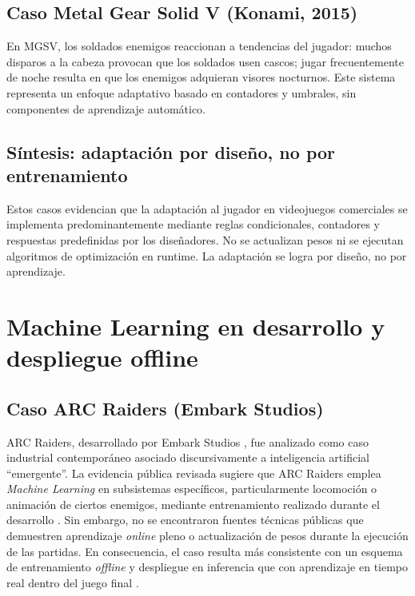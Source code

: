 \subsection{Caso Metal Gear Solid V (Konami, 2015)}

En MGSV, los soldados enemigos reaccionan a tendencias del jugador: muchos disparos a la cabeza provocan que los soldados usen cascos; jugar frecuentemente de noche resulta en que los enemigos adquieran visores nocturnos. Este sistema representa un enfoque adaptativo basado en contadores y umbrales, sin componentes de aprendizaje automático.

\subsection{Síntesis: adaptación por diseño, no por entrenamiento}

Estos casos evidencian que la adaptación al jugador en videojuegos comerciales se implementa predominantemente mediante reglas condicionales, contadores y respuestas predefinidas por los diseñadores. No se actualizan pesos ni se ejecutan algoritmos de optimización en runtime. La adaptación se logra por diseño, no por aprendizaje.

\section{Machine Learning en desarrollo y despliegue offline}

\subsection{Caso ARC Raiders (Embark Studios)}

ARC Raiders, desarrollado por Embark Studios \cite{arcraiders2025site}, fue analizado como caso industrial contemporáneo asociado discursivamente a inteligencia artificial ``emergente''. La evidencia pública revisada sugiere que ARC Raiders emplea \textit{Machine Learning} en subsistemas específicos, particularmente locomoción o animación de ciertos enemigos, mediante entrenamiento realizado durante el desarrollo \cite{arcraiders2025interview}. Sin embargo, no se encontraron fuentes técnicas públicas que demuestren aprendizaje \textit{online} pleno o actualización de pesos durante la ejecución de las partidas. En consecuencia, el caso resulta más consistente con un esquema de entrenamiento \textit{offline} y despliegue en inferencia que con aprendizaje en tiempo real dentro del juego final \cite{arcraiders2025steam}.

